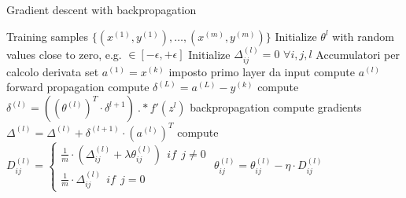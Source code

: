 \begin{algorithm}
    \caption{Gradient descent with backpropagation}
    \label{grad_desc_backprop}
    \begin{algorithmic}
        \State Training samples $\{ (x^{(1)}, y^{(1)}), \dotso, (x^{(m)}, y^{(m)}) \}$
        \State Initialize $\theta^{l}$ with random values close to zero, e.g. $\in [-\epsilon, +\epsilon]$
            \State Initialize $\Delta_{ij}^{(l)} = 0$ $\forall i, j, l$ \Comment Accumulatori per calcolo derivata
                \State set $a^{(1)} = x^{(k)}$ \Comment imposto primo layer da input
                    \State compute $a^{(l)}$ \Comment forward propagation
                \EndFor
                \State compute $\delta^{(L)} = a^{(L)} - y^{(k)}$
                    \State compute $\delta^{(l)} = ((\theta^{(l)})^T \cdot \delta^{l+1}) \ .* f'(z^{l})$ \Comment backpropagation
                \EndFor
                \State compute gradients $\Delta^{(l)} = \Delta^{(l)} + \delta^{(l+1)} \cdot (a^{(l)})^T$
            \EndFor
            \State compute $D^{(l)}_{ij} = 
            \begin{cases}
                \frac{1}{m} \cdot (\Delta^{(l)}_{ij} + \lambda \theta^{(l)}_{ij}) \ \ if \ \ j \neq 0 \\
                \frac{1}{m} \cdot \Delta^{(l)}_{ij} \ \ if \ \ j = 0
            \end{cases}$
            \State $\theta^{(l)}_{ij} = \theta^{(l)}_{ij} - \eta \cdot D_{ij}^{(l)}$
        \EndFor
    \end{algorithmic}
\end{algorithm}

